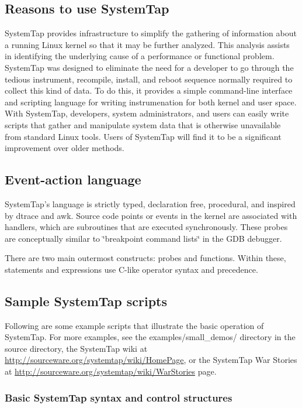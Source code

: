 \documentclass[twoside,english]{article}
\begin{document}
\subsection{Reasons to use SystemTap}

SystemTap provides infrastructure to simplify the gathering of information
about a running Linux kernel so that it may be further analyzed. This analysis
assists in identifying the underlying cause of a performance or functional
problem. SystemTap was designed to eliminate the need for a developer to
go through the tedious instrument, recompile, install, and reboot sequence
normally required to collect this kind of data. To do this, it provides a
simple command-line interface and scripting language for writing
instrumenation for both kernel and user space.
With SystemTap, developers, system administrators, and users can easily write
scripts that gather and manipulate system data that is otherwise unavailable
from standard Linux tools. Users of SystemTap will find it to be a significant
improvement over older methods.

\subsection{Event-action language}
SystemTap's language is strictly typed, declaration free, procedural, and
inspired by dtrace and awk. Source code points or events in the kernel are
associated with handlers, which are subroutines that are executed synchronously.
These probes are conceptually similar to \char`\"{}breakpoint command lists\char`\"{}
in the GDB debugger.

There are two main outermost constructs: probes and functions. Within these,
statements and expressions use C-like operator syntax and precedence.

\subsection{Sample SystemTap scripts}
Following are some example scripts that illustrate the basic operation of
SystemTap. For more examples, see the examples/small\_demos/ directory in
the source directory, the SystemTap wiki at \url{http://sourceware.org/systemtap/wiki/HomePage},
or the SystemTap War Stories at \url{http://sourceware.org/systemtap/wiki/WarStories} page.

\subsubsection{Basic SystemTap syntax and control structures}
\end{document}
